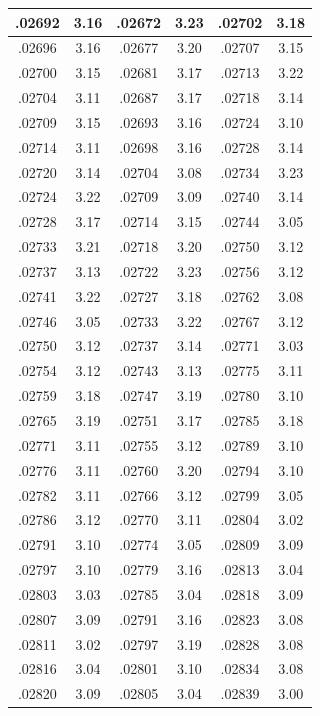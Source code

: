 \documentclass[11pt]{report}
\begin{document}
\begin{appendices}
\begin{longtable}{|c|c||c|c||c|c|}
.02692 & 3.16 & .02672 & 3.23 & .02702 & 3.18\\\hline
.02696 & 3.16 & .02677 & 3.20 & .02707 & 3.15\\\hline
.02700 & 3.15 & .02681 & 3.17 & .02713 & 3.22\\\hline
.02704 & 3.11 & .02687 & 3.17 & .02718 & 3.14\\\hline
.02709 & 3.15 & .02693 & 3.16 & .02724 & 3.10\\\hline
.02714 & 3.11 & .02698 & 3.16 & .02728 & 3.14\\\hline
.02720 & 3.14 & .02704 & 3.08 & .02734 & 3.23\\\hline
.02724 & 3.22 & .02709 & 3.09 & .02740 & 3.14\\\hline
.02728 & 3.17 & .02714 & 3.15 & .02744 & 3.05\\\hline
.02733 & 3.21 & .02718 & 3.20 & .02750 & 3.12\\\hline
.02737 & 3.13 & .02722 & 3.23 & .02756 & 3.12\\\hline
.02741 & 3.22 & .02727 & 3.18 & .02762 & 3.08\\\hline
.02746 & 3.05 & .02733 & 3.22 & .02767 & 3.12\\\hline
.02750 & 3.12 & .02737 & 3.14 & .02771 & 3.03\\\hline
.02754 & 3.12 & .02743 & 3.13 & .02775 & 3.11\\\hline
.02759 & 3.18 & .02747 & 3.19 & .02780 & 3.10\\\hline
.02765 & 3.19 & .02751 & 3.17 & .02785 & 3.18\\\hline
.02771 & 3.11 & .02755 & 3.12 & .02789 & 3.10\\\hline
.02776 & 3.11 & .02760 & 3.20 & .02794 & 3.10\\\hline
.02782 & 3.11 & .02766 & 3.12 & .02799 & 3.05\\\hline
.02786 & 3.12 & .02770 & 3.11 & .02804 & 3.02\\\hline
.02791 & 3.10 & .02774 & 3.05 & .02809 & 3.09\\\hline
.02797 & 3.10 & .02779 & 3.16 & .02813 & 3.04\\\hline
.02803 & 3.03 & .02785 & 3.04 & .02818 & 3.09\\\hline
.02807 & 3.09 & .02791 & 3.16 & .02823 & 3.08\\\hline
.02811 & 3.02 & .02797 & 3.19 & .02828 & 3.08\\\hline
.02816 & 3.04 & .02801 & 3.10 & .02834 & 3.08\\\hline
.02820 & 3.09 & .02805 & 3.04 & .02839 & 3.00\\\hline

\end{longtable}
\end{appendices}
\end{document}
